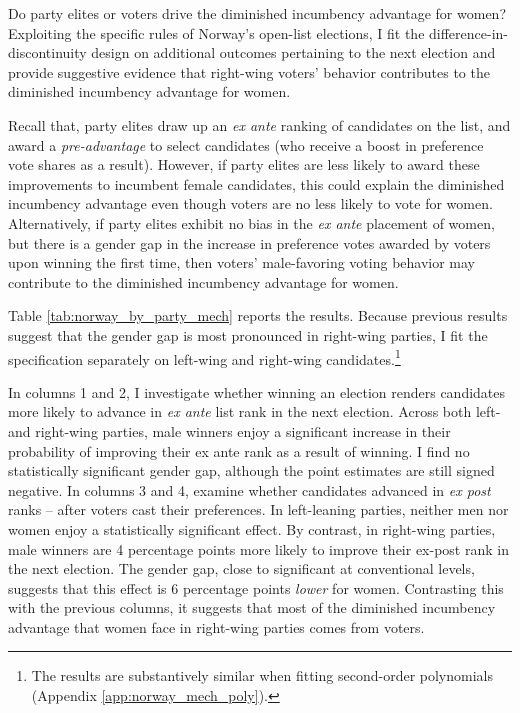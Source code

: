 \documentclass[12pt]{article}
\begin{document}
Do party elites or voters drive the diminished incumbency advantage for women? Exploiting the specific rules of Norway's open-list elections, I fit the difference-in-discontinuity design on additional outcomes pertaining to the next election and provide suggestive evidence that right-wing voters' behavior contributes to the diminished incumbency advantage for women.

Recall that, party elites draw up an \emph{ex ante} ranking of candidates on the list, and award a \emph{pre-advantage} to select candidates (who receive a boost in preference vote shares as a result). However, if party elites are less likely to award these improvements to incumbent female candidates, this could explain the diminished incumbency advantage even though voters are no less likely to vote for women. Alternatively, if party elites exhibit no bias in the \emph{ex ante} placement of women, but there is a gender gap in the increase in preference votes awarded by voters upon winning the first time, then voters' male-favoring voting behavior may contribute to the diminished incumbency advantage for women.



Table \ref{tab:norway_by_party_mech} reports the results.
Because previous results suggest that the gender gap is most pronounced in right-wing parties, I fit the specification separately on left-wing and right-wing candidates.\footnote{The results are substantively similar when fitting second-order polynomials (Appendix \ref{app:norway_mech_poly}).}

In columns 1 and 2, I investigate whether winning an election renders candidates more likely to advance in \emph{ex ante} list rank in the next election. Across both left- and right-wing parties, male winners enjoy a significant increase in their probability of improving their ex ante rank as a result of winning. I find no statistically significant gender gap, although the point estimates are still signed negative.
In columns 3 and 4, examine whether candidates advanced in \emph{ex post} ranks -- after voters cast their preferences. In left-leaning parties, neither men nor women enjoy a statistically significant effect. By contrast, in right-wing parties, male winners are 4 percentage points more likely to improve their ex-post rank in the next election. The gender gap, close to significant at conventional levels, suggests that this effect is 6 percentage points \emph{lower} for women. Contrasting this with the previous columns, it suggests that most of the diminished incumbency advantage that women face in right-wing parties comes from voters.
\end{document}
